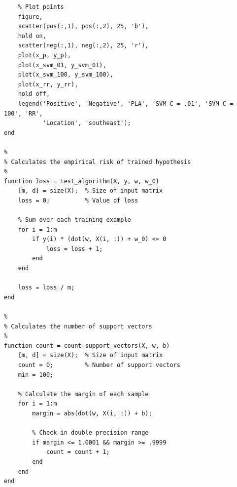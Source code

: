 \documentclass[11pt, oneside]{article}   	%
\begin{document}
\begin{verbatim}
    % Plot points
    figure,
    scatter(pos(:,1), pos(:,2), 25, 'b'),
    hold on,
    scatter(neg(:,1), neg(:,2), 25, 'r'),
    plot(x_p, y_p),
    plot(x_svm_01, y_svm_01),
    plot(x_svm_100, y_svm_100),
    plot(x_rr, y_rr),
    hold off,
    legend('Positive', 'Negative', 'PLA', 'SVM C = .01', 'SVM C = 100', 'RR', 
           'Location', 'southeast');
end

%
% Calculates the empirical risk of trained hypothesis
%
function loss = test_algorithm(X, y, w, w_0)
    [m, d] = size(X);  % Size of input matrix
    loss = 0;          % Value of loss
    
    % Sum over each training example
    for i = 1:m
        if y(i) * (dot(w, X(i, :)) + w_0) <= 0
            loss = loss + 1;
        end
    end
    
    loss = loss / m;
end

%
% Calculates the number of support vectors
%
function count = count_support_vectors(X, w, b)
    [m, d] = size(X);  % Size of input matrix
    count = 0;         % Number of support vectors
    min = 100;
    
    % Calculate the margin of each sample
    for i = 1:m
        margin = abs(dot(w, X(i, :)) + b);
        
        % Check in double precision range
        if margin <= 1.0001 && margin >= .9999
            count = count + 1;
        end
    end
end
\end{verbatim}
\end{document}
